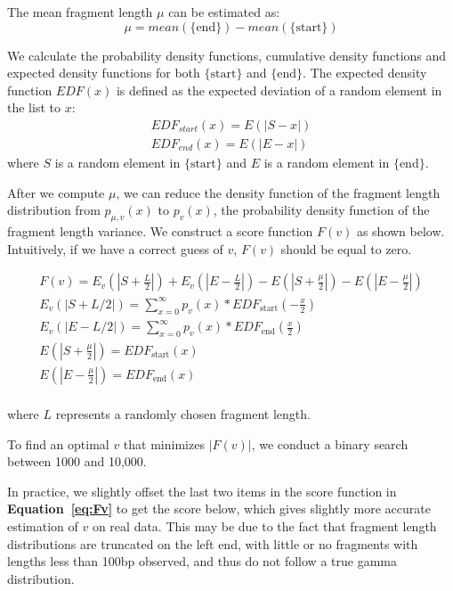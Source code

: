 \documentclass[12pt]{article}
\begin{document}
The mean fragment length $\mu$ can be estimated as:
\begin{equation}
  \mu = mean(\{\text{end}\}) - mean(\{\text{start}\})
\end{equation}

We calculate the probability density functions, cumulative density functions and expected density functions for both $\{\text{start}\}$ and $\{\text{end}\}$.
The expected density function $EDF(x)$ is defined as the expected deviation of a random element in the list to $x$:
\begin{equation} \label{eq:EDF}
  \begin{array}{c} 
    EDF_{start}(x) = E(|S - x|) \\
    EDF_{end}(x) = E(|E - x|)
    \end{array}
\end{equation}
where $S$ is a random element in $\{\text{start}\}$ and $E$ is a random element in $\{\text{end}\}$.

After we compute $\mu$, we can reduce the density function of the fragment length distribution from $p_{\mu, v}(x)$ to $p_v(x)$, the probability density function of the fragment length variance. 
We construct a score function $F(v)$ as shown below.
Intuitively, if we have a correct guess of $v$, $F(v)$ should be equal to zero.


\begin{equation}
  \begin{array}{c} \label{eq:Fv}
F(v) = E_v(|S + \frac{L}{2}|) + E_v(|E - \frac{L}{2}|) - E(|S + \frac{\mu}{2}|) - E(|E- \frac{\mu}{2}|) \\
E_v(|S + L/2|) = \sum_{x=0}^\infty p_v(x) * EDF_{\text{start}}(-\frac{x}{2}) \\
E_v(|E - L/2|) = \sum_{x=0}^\infty p_v(x) * EDF_{\text{end}}(\frac{x}{2}) \\
E(|S + \frac{\mu}{2}|)=EDF_{\text{start}}(x) \\
E(|E - \frac{\mu}{2}|)=EDF_{\text{end}}(x) \\
\end{array}
\end{equation}

where $L$ represents a randomly chosen fragment length.

To find an optimal $v$ that minimizes $|F(v)|$, we conduct a binary search between 1000 and 10,000.

In practice, we slightly offset the last two items in the score function in \textbf{Equation~\ref{eq:Fv}} to get the score below, which gives slightly more accurate estimation of $v$ on real data.
This may be due to the fact that fragment length distributions are truncated on the left end, with little or no fragments with lengths less than 100bp observed, and thus do not follow a true gamma distribution.
\end{document}
